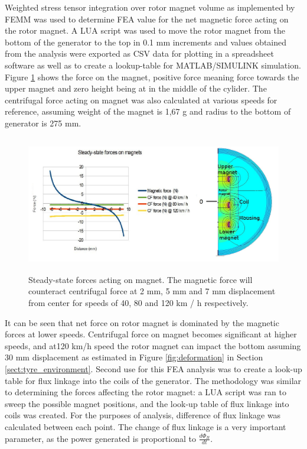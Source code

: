 Weighted stress tensor integration over rotor magnet volume as implemented by FEMM was used to determine FEA value for the net magnetic force acting on the rotor magnet. A LUA script was used to move the rotor magnet from the bottom of the generator to the top in 0.1 mm increments and values obtained from the analysis were exported as CSV data for plotting in a spreadsheet software as well as to create a lookup-table for MATLAB/SIMULINK simulation. Figure \ref{femm_forces} shows the force on the magnet, positive force meaning force towards the upper magnet and zero height being at in the middle of the cylider. The centrifugal force acting on magnet was also calculated at various speeds for reference, assuming weight of the magnet is 1,67 g and radius to the bottom of generator is 275 mm.

\begin{figure}[htb]
  \begin{center}
  \includegraphics[height=6cm]{images/own_dwg/femm_fvsd_dualmagnet.jpg}
  \end{center}
  \caption{\label{femm_forces} Steady-state forces acting on magnet. The magnetic force will counteract centrifugal force at 2 mm, 5 mm and 7 mm displacement from center for speeds of 40, 80 and 120 km / h respectively.}
\end{figure}

It can be seen that net force on rotor magnet is dominated by the magnetic forces at lower speeds. Centrifugal force on magnet becomes significant at higher speeds, and at120 km/h speed the rotor magnet can impact the bottom assuming 30 mm displacement as estimated in Figure \ref{fig:deformation} in Section \ref{sect:tyre_environment}. Second use for this FEA analysis was to create a look-up table for flux linkage into the coils of the generator. The methodology was similar to determining the forces affecting the rotor magnet: a LUA script was ran to sweep the possible magnet positions, and the look-up table of flux linkage into coils was created. For the purposes of analysis, difference of flux linkage was calculated between each point. The change of flux linkage is a very important parameter, as the power generated is proportional to $\frac{d \Phi_{B}}{d t}$. 

